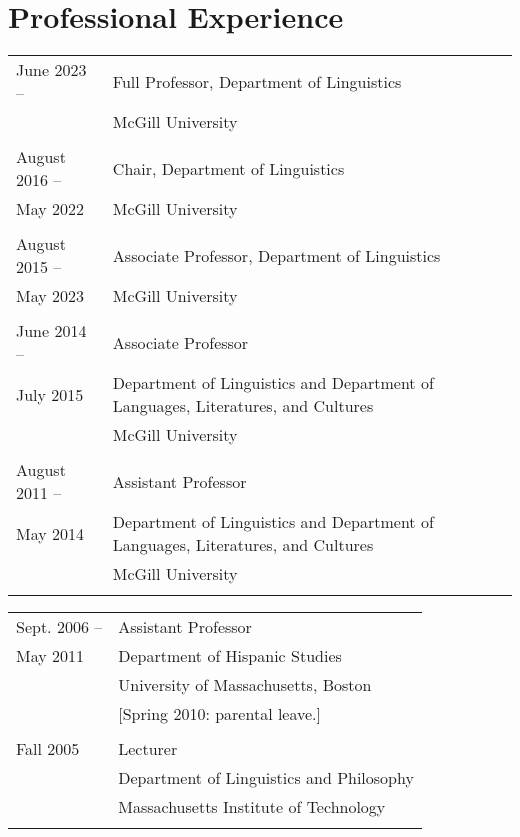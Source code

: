 \documentclass[11pt]{article}
\begin{document}
\section*{Professional Experience}

\begin{tabular}{p{2.815cm}p{280pt}}
June 2023 -- & Full Professor, Department of Linguistics\\
 &McGill University\\
  & \\[-8pt]
August 2016 -- &  Chair, Department of Linguistics\\
 May 2022 &McGill University\\
 & \\[-8pt]
August 2015 -- & Associate Professor, Department of Linguistics\\
 May 2023& McGill University\\
  & \\[-8pt]
June 2014 -- &  Associate Professor\\
July 2015 & Department of Linguistics and Department of Languages, Literatures, and Cultures\\ 
& McGill University\\
& \\[-8pt]
August 2011 -- &  Assistant Professor\\
May 2014& Department of Linguistics and Department of Languages, Literatures, and Cultures\\ 
& McGill University\\
& \\[-8pt]
\end{tabular}
\begin{tabular}{p{2.815cm}p{280pt}}
Sept. 2006 -- & Assistant Professor\\
May 2011&   Department of
Hispanic Studies\\
&  University of Massachusetts, Boston\\
 &  \footnotesize{[Spring 2010: parental leave.]}\\
& \\[-8pt]
Fall 2005 & Lecturer \\
& Department of Linguistics and Philosophy \\ 
& Massachusetts Institute of Technology\\
& \\[-8pt]
\end{tabular}
\end{document}
